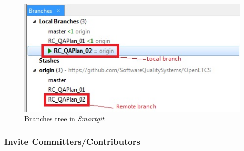 \documentclass{template/openetcs_article}
\begin{document}
\begin{figure}[H]
\centering
\includegraphics {./figures/Branches.JPG}
\caption{Branches tree in {\it Smartgit}}
\end{figure}

\subsubsection{Invite Committers/Contributors}
\end{document}
